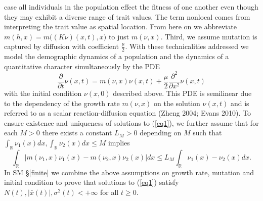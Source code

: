 \documentclass[]{article}
\begin{document}
case all individuals in the population effect the fitness of one another
even though they may exhibit a diverse range of trait values. The term
nonlocal comes from interpreting the trait value as spatial location.
From here on we abbreviate \(m(h,x)=m\big((K\nu)(x,t),x\big)\) to just
\(m(\nu,x)\). Third, we assume mutation is captured by diffusion with
coefficient \(\frac{\mu}{2}\). With these technicalities addressed we
model the demographic dynamics of a population and the dynamics of a
quantitative character simultaneously by the PDE
\begin{equation}\label{eq1}
\frac{\partial}{\partial t}\nu(x,t)=m(\nu,x)\nu(x,t)+\frac{\mu}{2}\frac{\partial^2}{\partial x^2}\nu(x,t)
\end{equation} with the initial condition \(\nu(x,0)\) described above.
This PDE is semilinear due to the dependency of the growth rate
\(m(\nu,x)\) on the solution \(\nu(x,t)\) and is referred to as a scalar
reaction-diffusion equation (Zheng 2004; Evans 2010). To ensure
existence and uniqueness of solutions to (\ref{eq1}), we further assume
that for each \(M>0\) there exists a constant \(L_M>0\) depending on
\(M\) such that
\(\int_\mathbb{R}\nu_1(x)dx,\int_\mathbb{R}\nu_2(x)dx\leq M\) implies
\begin{equation}\label{local_lipschitz}
\int_\mathbb{R}\left|m(\nu_1,x)\nu_1(x)-m(\nu_2,x)\nu_2(x)\right|dx\leq L_M\int_\mathbb{R}\nu_1(x)-\nu_2(x)dx.
\end{equation} In SM \S\ref{finite} we combine the above assumptions on
growth rate, mutation and initial condition to prove that solutions to
(\ref{eq1}) satisfy \(N(t),|\bar x(t)|,\sigma^2(t)<+\infty\) for all
\(t\geq0\).
\end{document}

